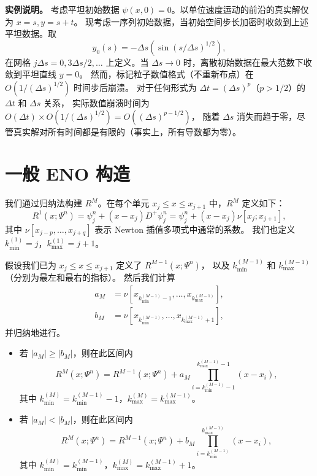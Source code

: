 \documentclass[11pt,a4paper]{article}
\begin{document}
\textbf{实例说明。} 考虑平坦初始数据 $\psi(x,0) = 0$。以单位速度运动的前沿的真实解仅为 $x = s, y = s + t$。
现考虑一序列初始数据，当初始空间步长加密时收敛到上述平坦数据。取
\begin{equation}
y_0(s) = -\Delta s(\sin(s/\Delta s)^{1/2}),
\end{equation}
在网格 $j\Delta s = 0, 3\Delta s/2, \ldots$ 上定义。当 $\Delta s \to 0$ 时，离散初始数据在最大范数下收敛到平坦直线 $y=0$。
然而，标记粒子数值格式（不重新布点）在 $O(1/(\Delta s)^{1/2})$ 时间步后崩溃。
对于任何形式为 $\Delta t = (\Delta s)^p$（$p > 1/2$）的 $\Delta t$ 和 $\Delta s$ 关系，
实际数值崩溃时间为 $O(\Delta t) \times O(1/(\Delta s)^{1/2}) = O((\Delta s)^{p-1/2})$，
随着 $\Delta s$ 消失而趋于零，尽管真实解对所有时间都是有限的（事实上，所有导数都为零）。

\newpage

\section{一般 ENO 构造}
\label{app:B}

我们通过归纳法构建 $R^M$。在每个单元 $x_j \leq x \leq x_{j+1}$ 中，$R^M$ 定义如下：
\begin{equation}
R^1(x; \Psi^n) = \psi_j^n + (x - x_j) D^+\psi_j^n
= \psi_j^n + (x - x_j) \nu[x_j; x_{j+1}],
\end{equation}
其中 $\nu[x_{j-p}, \ldots, x_{j+q}]$ 表示 Newton 插值多项式中通常的系数。
我们也定义 $k_{\min}^{(1)} = j$，$k_{\max}^{(1)} = j+1$。

假设我们已为 $x_j \leq x \leq x_{j+1}$ 定义了 $R^{M-1}(x; \Psi^n)$，
以及 $k_{\min}^{(M-1)}$ 和 $k_{\max}^{(M-1)}$（分别为最左和最右的指标）。
然后我们计算
\begin{align}
a_M &= \nu[x_{k_{\min}^{(M-1)}-1}, \ldots, x_{k_{\max}^{(M-1)}}], \\
b_M &= \nu[x_{k_{\min}^{(M-1)}}, \ldots, x_{k_{\max}^{(M-1)}+1}],
\end{align}
并归纳地进行。

\begin{itemize}
    \item 若 $|a_M| \geq |b_M|$，则在此区间内
    \begin{equation}
    R^M(x; \Psi^n) = R^{M-1}(x; \Psi^n) + a_M \prod_{i=k_{\min}^{(M-1)}-1}^{k_{\max}^{(M-1)}-1} (x - x_i),
    \end{equation}
    其中 $k_{\min}^{(M)} = k_{\min}^{(M-1)} - 1$，$k_{\max}^{(M)} = k_{\max}^{(M-1)}$。

    \item 若 $|a_M| < |b_M|$，则在此区间内
    \begin{equation}
    R^M(x; \Psi^n) = R^{M-1}(x; \Psi^n) + b_M \prod_{i=k_{\min}^{(M-1)}}^{k_{\max}^{(M-1)}} (x - x_i),
    \end{equation}
    其中 $k_{\min}^{(M)} = k_{\min}^{(M-1)}$，$k_{\max}^{(M)} = k_{\max}^{(M-1)} + 1$。
\end{itemize}
\end{document}
